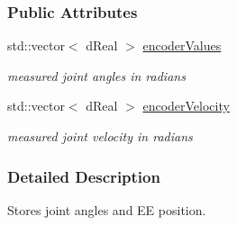 \subsubsection*{Public Attributes}
\begin{DoxyCompactItemize}
\item 
\hypertarget{classOpenRAVE_1_1SensorBase_1_1JointEncoderSensorData_ad9499e1a50311a0c5a0c1bce6a2f056e}{
std::vector$<$ dReal $>$ \hyperlink{classOpenRAVE_1_1SensorBase_1_1JointEncoderSensorData_ad9499e1a50311a0c5a0c1bce6a2f056e}{encoderValues}}
\label{classOpenRAVE_1_1SensorBase_1_1JointEncoderSensorData_ad9499e1a50311a0c5a0c1bce6a2f056e}

\begin{DoxyCompactList}\small\item\em measured joint angles in radians \item\end{DoxyCompactList}\item 
\hypertarget{classOpenRAVE_1_1SensorBase_1_1JointEncoderSensorData_aa7c9dfe4c94b296471b93f47a62805e5}{
std::vector$<$ dReal $>$ \hyperlink{classOpenRAVE_1_1SensorBase_1_1JointEncoderSensorData_aa7c9dfe4c94b296471b93f47a62805e5}{encoderVelocity}}
\label{classOpenRAVE_1_1SensorBase_1_1JointEncoderSensorData_aa7c9dfe4c94b296471b93f47a62805e5}

\begin{DoxyCompactList}\small\item\em measured joint velocity in radians \item\end{DoxyCompactList}\end{DoxyCompactItemize}


\subsubsection{Detailed Description}
Stores joint angles and EE position. 